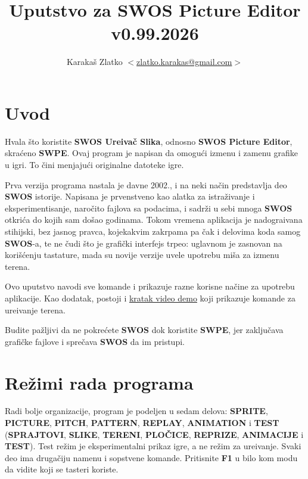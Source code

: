 \documentclass[a4paper,12pt]{article}
\author{Karaka\v s Zlatko $<$\href{mailto:zlatko.karakas@gmail.com}{zlatko.karakas@gmail.com}$>$}
\title{{\bf Uputstvo za SWOS Picture Editor}\\v0.99.2026}
\begin{document}

\maketitle

\section{Uvod}
Hvala \v sto koristite {\bf SWOS Ure\dj iva\v c Slika}, odnosno {\bf SWOS Picture Editor}, skra\'ceno {\bf SWPE}.
Ovaj program je napisan da omogu\'ci izmenu i zamenu grafike u igri. To \v cini menjaju\'ci originalne datoteke igre.

Prva verzija programa nastala je davne 2002., i na neki na\v cin predstavlja deo {\bf SWOS} istorije. Napisana
je prvenstveno kao alatka za istra\v zivanje i eksperimentisanje, naro\v cito fajlova sa podacima, i
sadr\v zi u sebi mnoga {\bf SWOS} otkri\'ca do kojih sam do\v sao godinama. Tokom vremena aplikacija je
nadogra\dj ivana stihijski, bez jasnog pravca, kojekakvim zakrpama pa \v cak i delovima koda samog {\bf SWOS}-a,
te ne \v cudi \v sto je grafi\v cki interfejs trpeo: uglavnom je zasnovan na kori\v s\'cenju tastature, mada su
novije verzije uvele upotrebu mi\v sa za izmenu terena.

Ovo uputstvo navodi sve komande i prikazuje razne korisne na\v cine za upotrebu aplikacije. Kao dodatak, postoji i
\href{https://youtu.be/MOIL5FJbcWQ}{kratak video demo} koji prikazuje komande za ure\dj ivanje terena.

Budite pa\v zljivi da ne pokre\'cete {\bf SWOS} dok koristite {\bf SWPE}, jer zaklju\v cava grafi\v cke fajlove
i spre\v cava {\bf SWOS} da im pristupi.

\newpage
\section{Re\v zimi rada programa}

Radi bolje organizacije, program je podeljen u sedam delova:
{\bf SPRITE}, {\bf PICTURE}, {\bf PITCH}, {\bf PATTERN}, {\bf REPLAY},
{\bf ANIMATION} i {\bf TEST} ({\bf SPRAJTOVI}, {\bf SLIKE}, {\bf TERENI},
{\bf PLO\v CICE}, {\bf REPRIZE}, {\bf ANIMACIJE} i {\bf TEST}). Test re\v zim
je eksperimentalni prikaz igre, a ne re\v zim za ure\dj ivanje.
Svaki deo ima druga\v ciju namenu i sopstvene komande. Pritisnite
{\bf F1} u bilo kom modu da vidite koji se tasteri koriste.
\end{document}
